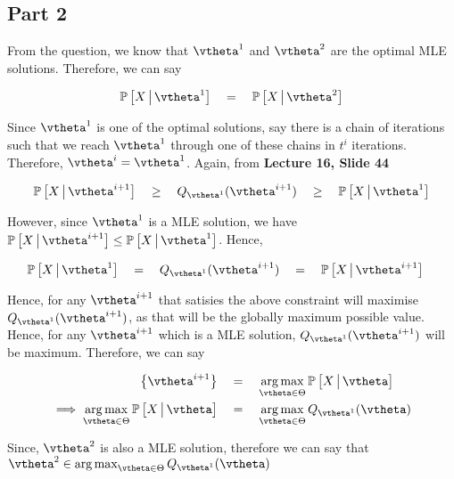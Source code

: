 \documentclass{article}
\begin{document}
\begin{mlsolution}
\begin{addmargin}{1.5em}
	\end{addmargin}

	\subsection*{Part 2}
	\begin{addmargin}{1.5em}

		From the question, we know that $\vtheta^1$ and $\vtheta^2$ are the optimal MLE solutions. Therefore, we can say

		\begin{align*}
			\prob{X \pipe \vtheta^1}	\eq	\prob{X \pipe \vtheta^2}
		\end{align*}

		Since $\vtheta^1$ is one of the optimal solutions, say there is a chain of iterations such that we reach $\vtheta^1$ through one of these chains in $t^i$ iterations. Therefore, $\vtheta^{i} = \vtheta^1$. Again, from \textbf{Lecture 16, Slide 44}

		\begin{align*}
			\prob{X \pipe \vtheta^{i + 1}}	\qge	Q_{\vtheta^1}(\vtheta^{i + 1})	\qge	\prob{X \pipe \vtheta^1}
		\end{align*}

		However, since $\vtheta^1$ is a MLE solution, we have $\prob{X \pipe \vtheta^{i + 1}} \le \prob{X \pipe \vtheta^1}$. Hence,

		\begin{align*}
			\prob{X \pipe \vtheta^1}										&	\eq	Q_{\vtheta^1}(\vtheta^{i + 1})	\eq	\prob{X \pipe \vtheta^{i + 1}}
		\end{align*}

		Hence, for any $\vtheta^{i + 1}$ that satisies the above constraint will maximise $Q_{\vtheta^1}(\vtheta^{i + 1})$, as that will be the globally maximum possible value. Hence, for any $\vtheta^{i + 1}$ which is a MLE solution, $Q_{\vtheta^1}(\vtheta^{i + 1})$ will be maximum. Therefore, we can say

		\begin{align*}
			\set{\vtheta^{i + 1}}											&\eq	\argmax_{\vtheta \in \Theta} \prob{X \pipe \vtheta} \\
			\implies \argmax_{\vtheta \in \Theta} \prob{X \pipe \vtheta}	&\eq	\argmax_{\vtheta \in \Theta} Q_{\vtheta^1}(\vtheta)
		\end{align*}

		Since, $\vtheta^2$ is also a MLE solution, therefore we can say that $\vtheta^2 \in \argmax_{\vtheta \in \Theta} Q_{\vtheta^1}(\vtheta)$


\end{addmargin}
\end{mlsolution}
\end{document}
